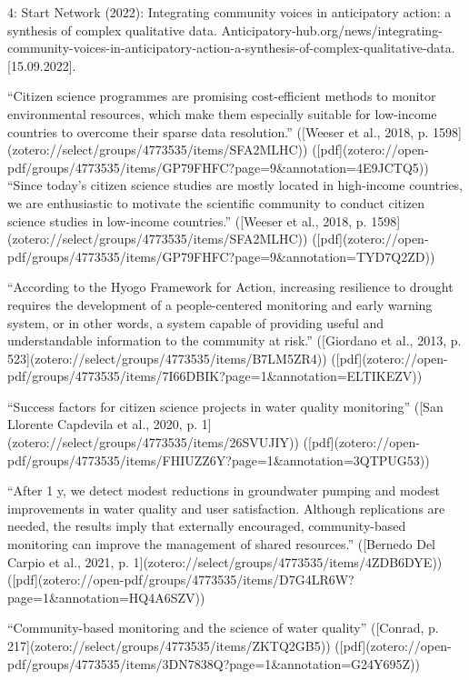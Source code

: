 {4: Start Network (2022): Integrating community voices in anticipatory action: a synthesis of complex qualitative data. Anticipatory-hub.org/news/integrating-community-voices-in-anticipatory-action-a-synthesis-of-complex-qualitative-data. [15.09.2022].

“Citizen science programmes are promising cost-efficient methods to monitor environmental resources, which make them especially suitable for low-income countries to overcome their sparse data resolution.” ([Weeser et al., 2018, p. 1598](zotero://select/groups/4773535/items/SFA2MLHC)) ([pdf](zotero://open-pdf/groups/4773535/items/GP79FHFC?page=9&annotation=4E9JCTQ5))
“Since today's citizen science studies are mostly located in high-income countries, we are enthusiastic to motivate the scientific community to conduct citizen science studies in low-income countries.” ([Weeser et al., 2018, p. 1598](zotero://select/groups/4773535/items/SFA2MLHC)) ([pdf](zotero://open-pdf/groups/4773535/items/GP79FHFC?page=9&annotation=TYD7Q2ZD))

“According to the Hyogo Framework for Action, increasing resilience to drought requires the development of a people-centered monitoring and early warning system, or in other words, a system capable of providing useful and understandable information to the community at risk.” ([Giordano et al., 2013, p. 523](zotero://select/groups/4773535/items/B7LM5ZR4)) ([pdf](zotero://open-pdf/groups/4773535/items/7I66DBIK?page=1&annotation=ELTIKEZV))

“Success factors for citizen science projects in water quality monitoring” ([San Llorente Capdevila et al., 2020, p. 1](zotero://select/groups/4773535/items/26SVUJIY)) ([pdf](zotero://open-pdf/groups/4773535/items/FHIUZZ6Y?page=1&annotation=3QTPUG53))

“After 1 y, we detect modest reductions in groundwater pumping and modest improvements in water quality and user satisfaction. Although replications are needed, the results imply that externally encouraged, community-based monitoring can improve the management of shared resources.” ([Bernedo Del Carpio et al., 2021, p. 1](zotero://select/groups/4773535/items/4ZDB6DYE)) ([pdf](zotero://open-pdf/groups/4773535/items/D7G4LR6W?page=1&annotation=HQ4A6SZV))

“Community-based monitoring and the science of water quality” ([Conrad, p. 217](zotero://select/groups/4773535/items/ZKTQ2GB5)) ([pdf](zotero://open-pdf/groups/4773535/items/3DN7838Q?page=1&annotation=G24Y695Z))


}
